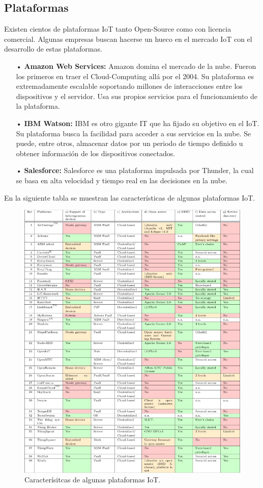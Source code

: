 \documentclass[12pt, twoside]{book}
\begin{document}
\subsection{Plataformas}
Existen cientos de plataformas IoT tanto Open-Source como con licencia comercial. Algunas empresas buscan hacerse un hueco en el mercado IoT con el desarrollo de estas plataformas. 
\begin{itemize}
\item[•]\textbf{Amazon Web Services: }Amazon domina el mercado de la nube. Fueron los primeros en traer el Cloud-Computing allá por el 2004. Su plataforma es extremadamente escalable soportando millones de interacciones entre los dispositivos y el servidor. Usa sus propios servicios para el funcionamiento de la plataforma. 
\item[•]\textbf{IBM Watson: }IBM es otro gigante IT que ha fijado su objetivo en el IoT. Su plataforma busca la facilidad para acceder a sus servicios en la nube. Se puede, entre otros, almacenar datos por un periodo de tiempo definido u obtener información de los dispositivos conectados.  
\item[•]\textbf{Salesforce: } Salesforce es una plataforma impulsada por Thunder, la cual se basa en alta velocidad y tiempo real en las decisiones en la nube.
\end{itemize}


En la siguiente tabla\cite{platform_gap} se muestran las características de algunas plataformas IoT.
\begin{figure}[H]
\centering
\includegraphics[scale=0.7]{images/platforms}
\caption{Caracterísitcas de algunas plataformas IoT.}\label{L400}
\end{figure}
\end{document}
